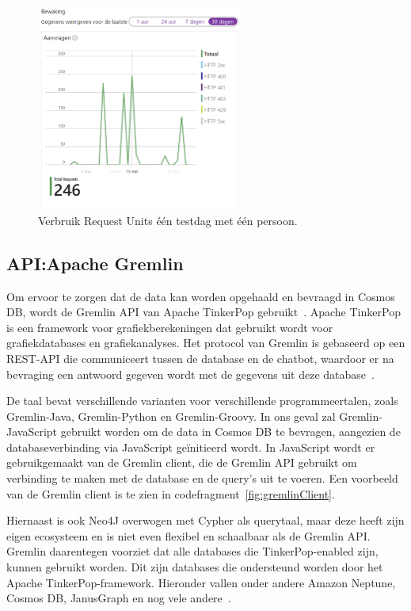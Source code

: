  \begin{figure}[H]
     \centering
     \includegraphics[width=0.6\textwidth]{./img/requestUnits.png}
     \caption[Verbruik Request Units]{\label{fig:RU}Verbruik Request Units één testdag met één persoon.}
\end{figure}

\subsection{API:\@ Apache Gremlin}{\label{sec:gremlin}}
Om ervoor te zorgen dat de data kan worden opgehaald en bevraagd in Cosmos DB, wordt de Gremlin API van Apache TinkerPop gebruikt~\autocite{Tinkerpop2023}.
Apache TinkerPop is een framework voor grafiekberekeningen dat gebruikt wordt voor grafiekdatabases en grafiekanalyses.
Het protocol van Gremlin is gebaseerd op een REST-API die communiceert tussen de database en de chatbot, waardoor er na bevraging een antwoord gegeven wordt met de gegevens uit deze database~\autocite{Medina2021}.

De taal bevat verschillende varianten voor verschillende programmeertalen, zoals Gremlin-Java, Gremlin-Python en Gremlin-Groovy.
In ons geval zal Gremlin-JavaScript gebruikt worden om de data in Cosmos DB te bevragen, aangezien de databaseverbinding via JavaScript geïnitieerd wordt. 
In JavaScript wordt er gebruikgemaakt van de Gremlin client, die de Gremlin API gebruikt om verbinding te maken met de database en de query's uit te voeren.
Een voorbeeld van de Gremlin client is te zien in codefragment~\ref{fig:gremlinClient}.

Hiernaast is ook Neo4J overwogen met Cypher als querytaal, maar deze heeft zijn eigen ecosysteem en is niet even flexibel en schaalbaar als de Gremlin API.\@
Gremlin daarentegen voorziet dat alle databases die TinkerPop-enabled zijn, kunnen gebruikt worden. Dit zijn databases die ondersteund worden door het Apache TinkerPop-framework.
Hieronder vallen onder andere Amazon Neptune, Cosmos DB, JanusGraph en nog vele andere~\autocite{Tinkerpop2023a}.

